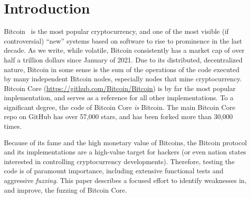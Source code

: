 \section{Introduction}

Bitcoin~\cite{nakamoto2008bitcoin} is the most popular cryptocurrency, and one of the most visible (if controversial) ``new'' systems based on software to rise to prominence in the last decade.  As we write, while volatile, Bitcoin consistently has a market cap of over half a trillion dollars since January of 2021.  Due to its distributed, decentralized nature, Bitcoin in some sense is the sum of the operations of the code executed by many independent Bitcoin nodes, especially nodes that mine cryptocurrency.  Bitcoin Core (\url{https://github.com/Bitcoin/Bitcoin}) is by far the most popular implementation, and serves as a reference for all other implementations.  To a significant degree, the code of Bitcoin Core \emph{is} Bitcoin.  The main Bitcoin Core repo on GitHub has over 57,000 stars, and has been forked more than 30,000 times.

Because of its fame and the high monetary value of Bitcoins, the Bitcoin protocol and its implementations are a high-value target for hackers (or even nation states interested in controlling cryptocurrency developments).  Therefore, testing the code is of paramount importance, including extensive functional tests and aggressive \emph{fuzzing}.  This paper describes a focused effort to identify weaknesses in, and improve, the fuzzing of Bitcoin Core.

